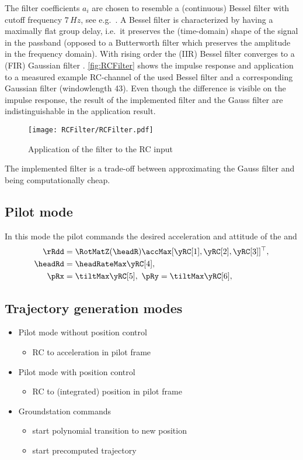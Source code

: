 The filter coefficients $a_i$ are chosen to resemble a (continuous) Bessel filter with cutoff frequency $7\,\unit{Hz}$, see e.g.\ \cite[sec.\,13.1.3]{TietzeSchenk:Halbleiter-Schaltungstechnik}.
A Bessel filter is characterized by having a maximally flat group delay, i.e.\ it preserves the (time-domain) shape of the signal in the passband (opposed to a Butterworth filter which preserves the amplitude in the frequency domain).
With rising order the (IIR) Bessel filter converges to a (FIR) Gaussian filter \cite[sec.\ 4.9.2]{Rabiner:DSP}.
\autoref{fig:RCFilter} shows the impulse response and application to a measured example RC-channel of the used Bessel filter and a corresponding Gaussian filter (windowlength 43).
Even though the difference is visible on the impulse response, the result of the implemented filter and the Gauss filter are indistinguishable in the application result.

\begin{figure}[t]
 \centering
 \texttt{[image: RCFilter/RCFilter.pdf]} 
 \caption{Application of the filter to the RC input}
 \label{fig:RCFilter}
\end{figure}

The implemented filter is a trade-off between approximating the Gauss filter and being computationally cheap.

\subsection{Pilot mode}
In this mode the pilot commands the desired acceleration and attitude of the \Multicopter and 
\begin{align}
 \rRdd &= \RotMatZ(\headR) \accMax [\yRC[1], \yRC[2], \yRC[3]]^\top, 
\\
 \headRd &= \headRateMax \yRC[4],
\\
 \pRx &= \tiltMax \yRC[5], \ \pRy = \tiltMax \yRC[6],
\end{align}



\subsection{Trajectory generation modes}
\begin{itemize}
 \item Pilot mode without position control
 \begin{itemize}
  \item RC to acceleration in pilot frame
 \end{itemize}
 \item Pilot mode with position control
 \begin{itemize}
  \item RC to (integrated) position in pilot frame
 \end{itemize}
 \item Groundstation commands
 \begin{itemize}
  \item start polynomial transition to new position
  \item start precomputed trajectory
 \end{itemize}
\end{itemize}


